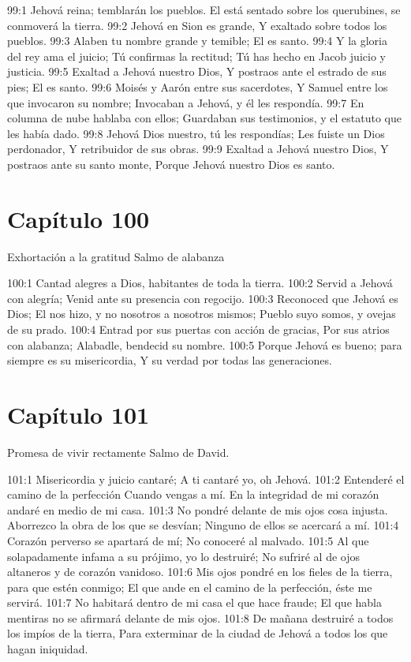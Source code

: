 99:1 Jehová reina; temblarán los pueblos. 
El está sentado sobre los querubines, se conmoverá la tierra. 
99:2 Jehová en Sion es grande, 
Y exaltado sobre todos los pueblos. 
99:3 Alaben tu nombre grande y temible; 
El es santo. 
99:4 Y la gloria del rey ama el juicio; 
Tú confirmas la rectitud; 
Tú has hecho en Jacob juicio y justicia. 
99:5 Exaltad a Jehová nuestro Dios, 
Y postraos ante el estrado de sus pies; 
El es santo. 
99:6 Moisés y Aarón entre sus sacerdotes, 
Y Samuel entre los que invocaron su nombre; 
Invocaban a Jehová, y él les respondía. 
99:7 En columna de nube hablaba con ellos; 
Guardaban sus testimonios, y el estatuto que les había dado. 
99:8 Jehová Dios nuestro, tú les respondías; 
Les fuiste un Dios perdonador, 
Y retribuidor de sus obras. 
99:9 Exaltad a Jehová nuestro Dios, 
Y postraos ante su santo monte, 
Porque Jehová nuestro Dios es santo. 
\section*{Capítulo 100}
Exhortación a la gratitud 
Salmo de alabanza 
 
100:1 Cantad alegres a Dios, habitantes de toda la tierra. 
100:2 Servid a Jehová con alegría; 
Venid ante su presencia con regocijo. 
100:3 Reconoced que Jehová es Dios; 
El nos hizo, y no nosotros a nosotros mismos; 
Pueblo suyo somos, y ovejas de su prado. 
100:4 Entrad por sus puertas con acción de gracias, 
Por sus atrios con alabanza; 
Alabadle, bendecid su nombre. 
100:5 Porque Jehová es bueno; para siempre es su misericordia, 
Y su verdad por todas las generaciones. 
\section*{Capítulo 101}
Promesa de vivir rectamente 
Salmo de David. 
 
101:1 Misericordia y juicio cantaré; 
A ti cantaré yo, oh Jehová. 
101:2 Entenderé el camino de la perfección 
Cuando vengas a mí. 
En la integridad de mi corazón andaré en medio de mi casa. 
101:3 No pondré delante de mis ojos cosa injusta. 
Aborrezco la obra de los que se desvían; 
Ninguno de ellos se acercará a mí. 
101:4 Corazón perverso se apartará de mí; 
No conoceré al malvado. 
101:5 Al que solapadamente infama a su prójimo, yo lo destruiré; 
No sufriré al de ojos altaneros y de corazón vanidoso. 
101:6 Mis ojos pondré en los fieles de la tierra, para que estén conmigo; 
El que ande en el camino de la perfección, éste me servirá. 
101:7 No habitará dentro de mi casa el que hace fraude; 
El que habla mentiras no se afirmará delante de mis ojos. 
101:8 De mañana destruiré a todos los impíos de la tierra, 
Para exterminar de la ciudad de Jehová a todos los que hagan iniquidad. 
